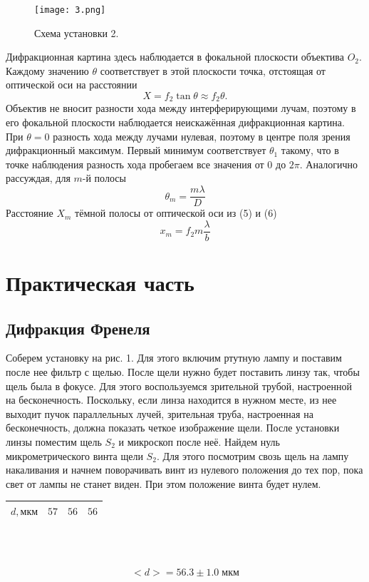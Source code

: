 \documentclass[a4paper,12pt]{article} %
\begin{document}
\begin{figure}[h]
\texttt{[image: 3.png]}
\centering
\caption{Схема установки 2.}
\end{figure}
Дифракционная картина здесь наблюдается в фокальной плоскости объектива $O_2$. Каждому значению $\theta$ соответствует в этой плоскости точка, отстоящая от оптической оси на расстоянии 
\begin{equation}
X = f_2 \tan \theta \approx f_2 \theta.
\end{equation}
Объектив не вносит разности хода между интерферирующими лучам, поэтому в его фокальной плоскости наблюдается неискажённая дифракционная картина. При $\theta = 0$ разность хода между лучами нулевая, поэтому в центре поля зрения дифракционный максимум. Первый минимум соответствует $\theta_1$ такому, что в точке наблюдения разность хода пробегаем все значения от 0 до $2\pi$. Аналогично рассуждая, для $m$-й полосы
\begin{equation}
\theta_m = \frac{m \lambda}{D}
\end{equation}
Расстояние $X_m$ тёмной полосы от оптической оси из (5) и (6)
\begin{equation}
x_m = f_2m\frac{\lambda}{b}
\end{equation}

\section{Практическая часть}
\subsection{Дифракция Френеля}
Соберем установку на рис. 1. Для этого включим ртутную лампу и поставим после нее фильтр с щелью. После щели нужно будет поставить линзу так, чтобы щель была в фокусе. Для этого воспользуемся зрительной трубой, настроенной на бесконечность. Поскольку, если линза находится в нужном месте, из нее выходит пучок параллельных лучей, зрительная труба, настроенная на бесконечность, должна показать четкое изображение щели. После установки линзы поместим щель $S_2$ и микроскоп после неё.
Найдем нуль микрометрического винта щели $S_2$. Для этого посмотрим свозь щель на лампу накаливания и начнем поворачивать винт из нулевого положения до тех пор, пока свет от лампы не станет виден. При этом положение винта будет нулем.

\begin{center}
\begin{tabular}{|c|c|c|c|}
\hline
$d, \text{мкм}$&$57$&$56$&$56$\\ \hline
\end{tabular}\\~\\
\end{center} 
\[<d> = 56.3 \pm 1.0\; \text{мкм}\]
\end{document}
